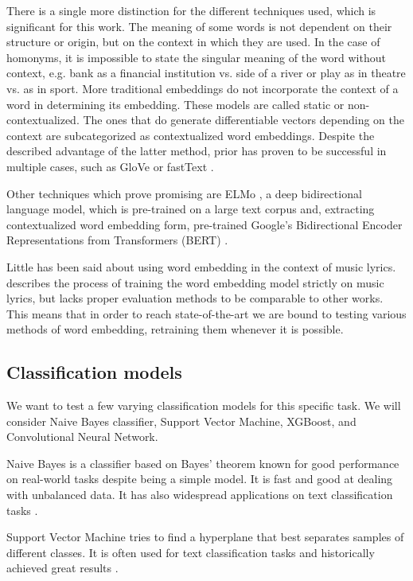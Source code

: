 There is a single more distinction for the different techniques used, which is significant for this work. The meaning of some words is not dependent on their structure or origin, but on the context in which they are used. In the case of homonyms, it is impossible to state the singular meaning of the word without context, e.g. bank as a financial institution vs. side of a river or play as in theatre vs. as in sport. More traditional embeddings do not incorporate the context of a word in determining its embedding. These models are called static or non-contextualized. The ones that do generate differentiable vectors depending on the context are subcategorized as contextualized word embeddings. Despite the described advantage of the latter method, prior has proven to be successful in multiple cases, such as GloVe \cite{glove} or fastText \cite{fastText}.

Other techniques which prove promising are ELMo \cite{elmo}, a deep bidirectional language model, which is pre-trained on a large text corpus and, extracting contextualized word embedding form, pre-trained Google’s Bidirectional Encoder Representations from Transformers (BERT) \cite{bert}. 

Little has been said about using word embedding in the context of music lyrics. \cite{musicWordEmbed} describes the process of training the word embedding model strictly on music lyrics, but lacks proper evaluation methods to be comparable to other works. This means that in order to reach state-of-the-art we are bound to testing various methods of word embedding, retraining them whenever it is possible. 



\subsection{Classification models}

We want to test a few varying classification models for this specific task. We will consider Naive Bayes classifier, Support Vector Machine, XGBoost, and Convolutional Neural Network.

Naive Bayes is a classifier based on Bayes' theorem known for good performance on real-world tasks despite being a simple model. It is fast and good at dealing with unbalanced data. It has also widespread applications on text classification tasks \cite{naiveBayesRef}.

Support Vector Machine tries to find a hyperplane that best separates samples of different classes. It is often used for text classification tasks and historically achieved great results \cite{svmRef}.

